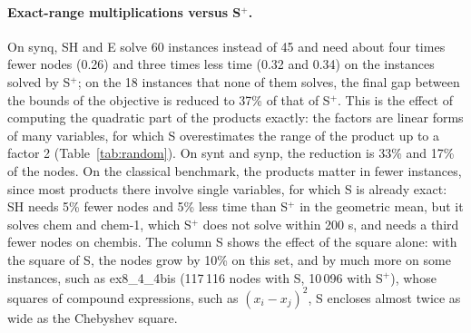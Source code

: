 \documentclass[10pt]{article}
\theoremstyle{definition}
\begin{document}
\begin{table}[H]
\centering
\caption{IbexOpt with S (the standard multiplication and square of fAF2), S$^+$ (the products of S with the Chebyshev square), SH and E (both with the Chebyshev square): instances solved within the time limit $t_{\max}$ (s), geometric means of nodes and CPU time relative to S$^+$ over the instances solved by all the variants, geometric mean of the nodes of E relative to SH, and numbers of instances where E needs at least 1\% fewer / more nodes than SH.}
\label{tab:solver}
\small
\setlength{\tabcolsep}{3.5pt}

\end{table}

\paragraph{Exact-range multiplications versus S$^+$.} On synq, SH and E solve 60 instances instead of 45 and need about four times fewer nodes (0.26) and three times less time (0.32 and 0.34) on the instances solved by S$^+$; on the 18 instances that none of them solves, the final gap between the bounds of the objective is reduced to 37\% of that of S$^+$. This is the effect of computing the quadratic part of the products exactly: the factors are linear forms of many variables, for which S overestimates the range of the product up to a factor 2 (Table~\ref{tab:random}). On synt and synp, the reduction is 33\% and 17\% of the nodes. On the classical benchmark, the products matter in fewer instances, since most products there involve single variables, for which S is already exact: SH needs 5\% fewer nodes and 5\% less time than S$^+$ in the geometric mean, but it solves chem and chem-1, which S$^+$ does not solve within 200 s, and needs a third fewer nodes on chembis. The column S shows the effect of the square alone: with the square of S, the nodes grow by 10\% on this set, and by much more on some instances, such as ex8\_4\_4bis (117\,116 nodes with S, 10\,096 with S$^+$), whose squares of compound expressions, such as $(x_i-x_j)^2$, S encloses almost twice as wide as the Chebyshev square.
\end{document}
